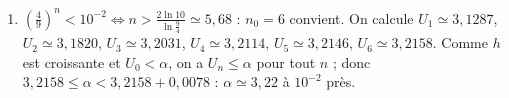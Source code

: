 \begin{corrige}
\begin{sol}
\begin{enumerate}
\begin{enumerate}
            Comme $0 < \frac{4}{9} < 1$, $\left(\frac{4}{9}\right)^n \to 0$, donc $U_n \to \alpha$ : la suite converge vers $\alpha$.
      \item $\left(\frac{4}{9}\right)^n < 10^{-2} \iff n > \frac{2\ln 10}{\ln \frac{9}{4}} \simeq 5{,}68$ : $n_0 = 6$ convient.
            On calcule $U_1 \simeq 3{,}1287$, $U_2 \simeq 3{,}1820$, $U_3 \simeq 3{,}2031$, $U_4 \simeq 3{,}2114$, $U_5 \simeq 3{,}2146$, $U_6 \simeq 3{,}2158$.
            Comme $h$ est croissante et $U_0 < \alpha$, on a $U_n \leq \alpha$ pour tout $n$ ; donc $3{,}2158 \leq \alpha < 3{,}2158 + 0{,}0078$ :
            $\boxed{\alpha \simeq 3{,}22}$ \`a $10^{-2}$ pr\`es.
      \end{enumerate}
\end{enumerate}
\end{sol}


\end{corrige}
